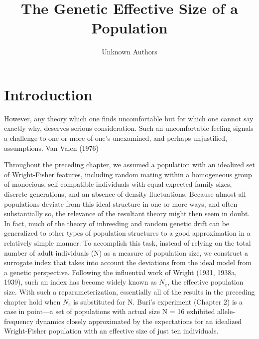 \documentclass{article}
\title{The Genetic Effective Size
of a Population}
\author{Unknown Authors}
\date{}
\begin{document}
\maketitle

\begin{abstract}

\end{abstract}

\section{Introduction}
However, any theory which one finds uncomfortable but for which one cannot say exactly why, deserves serious consideration. Such an uncomfortable feeling signals a challenge to one or more of one's unexamined, and perhaps unjustified, assumptions. Van Valen (1976)

Throughout the preceding chapter, we assumed a population with an idealized set of Wright-Fisher features, including random mating within a homogeneous group of monocious, self-compatible individuals with equal expected family sizes, discrete generations, and an absence of density fluctuations. Because almost all populations deviate from this ideal structure in one or more ways, and often substantially so, the relevance of the resultant theory might then seem in doubt. In fact, much of the theory of inbreeding and random genetic drift can be generalized to other types of population structures to a good approximation in a relatively simple manner. To accomplish this task, instead of relying on the total number of adult individuals (N) as a measure of population size, we construct a surrogate index that takes into account the deviations from the ideal model from a genetic perspective. Following the influential work of Wright (1931, 1938a, 1939), such an index has become widely known as  $ N_{e} $, the effective population size. With such a reparameterization, essentially all of the results in the preceding chapter hold when  $ N_{e} $ is substituted for N. Buri's experiment (Chapter 2) is a case in point—a set of populations with actual size N = 16 exhibited allele-frequency dynamics closely approximated by the expectations for an idealized Wright-Fisher population with an effective size of just ten individuals.
\end{document}
